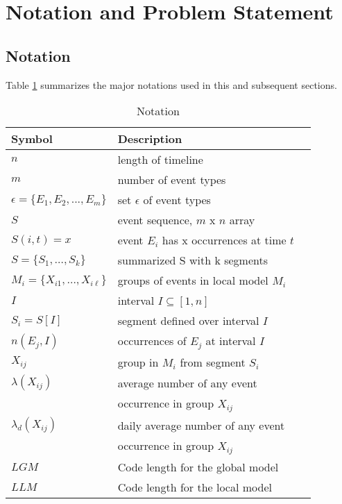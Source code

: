 \section{Notation and Problem Statement}
\subsection{Notation}
Table \ref{tab:notation} summarizes the major notations used in this and subsequent sections. 
\begin{table}[!h]
\centering
    \caption{Notation}     
    \label{tab:notation}
    \begin{small}
    \begin{tabular}{|ll|l}
    \hline
    {\bfseries Symbol} & {\bfseries  Description}      \\
    \hline
    $n$ & length of timeline  \\    \hline
    $m$ & number of event types \\    \hline
    $\epsilon=\{E_1,E_2,...,E_m\}$ & set $\epsilon$ of event types\\  \hline
    $S$ & event sequence, $m \text{ x } n$ array \\    \hline
    $S (i, t) = x$ & event $E_i$ has x occurrences at time $t$\\    \hline
    $S = \{S_1,\dots ,S_k\}$ & summarized S with k segments \\    \hline
    $M_i = \{X_{i1},\dots ,X_{i\ell}\}$&groups of events in local model $M_i$\\    \hline
    $I$ & interval $I \subseteq [1,n]$ \\    \hline
    $S_i=S[I]$ & segment defined over interval $I$ \\    \hline
    $n(E_j,I)$ & occurrences of $E_j$ at interval $I$ \\   \hline
    $X_{ij}$& group in $M_i$ from segment $S_i$ \\   \hline
    $\lambda(X_{ij})$ &average number of any event  \\  
    &occurrence in group $X_{ij}$\\  \hline
    $\lambda_{d}(X_{ij})$ &daily average number of any event \\  
    &occurrence in group $X_{ij}$ \\    \hline
    $LGM$ & Code length for the global model  \\    \hline
    $LLM$ & Code length for the local model  \\    \hline
    \end{tabular}
    \end{small} 
\end{table}

